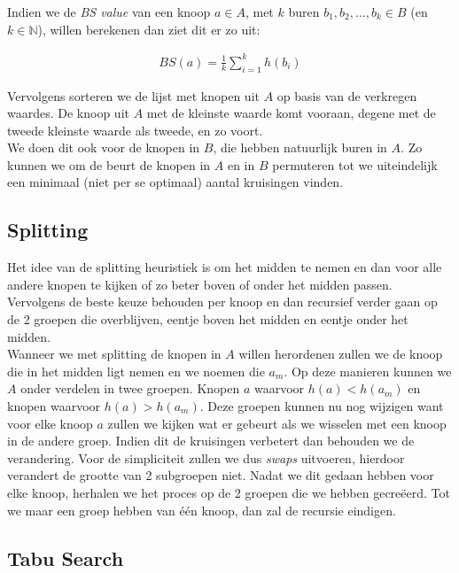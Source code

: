 \documentclass[kulak]{kulakarticle} %
\begin{document}
\noindent Indien we de \textit{BS value} van een knoop $a \in A$, met $k$ buren $b_1, b_2, ..., b_k \in B$ (en $k \in \mathbb{N}$), willen berekenen dan ziet dit er zo uit:

\begin{align*}
    \textit{BS}(a) = \frac{1}{k} \sum_{i=1}^{k} h(b_i) 
\end{align*}

\noindent Vervolgens sorteren we de lijst met knopen uit $A$ op basis van de verkregen waardes. De knoop uit $A$ met de kleinste waarde komt vooraan, degene met de tweede kleinste waarde als tweede, en zo voort. \\

\noindent We doen dit ook voor de knopen in $B$, die hebben natuurlijk buren in $A$. Zo kunnen we om de beurt de knopen in $A$ en in $B$ permuteren tot we uiteindelijk een minimaal (niet per se optimaal) aantal kruisingen vinden. 

\subsection{Splitting}

Het idee van de splitting heuristiek is om het midden te nemen en dan voor alle andere knopen te kijken of zo beter boven of onder het midden passen. Vervolgens de beste keuze behouden per knoop en dan recursief verder gaan op de 2 groepen die overblijven, eentje boven het midden en eentje onder het midden. \\

\noindent Wanneer we met splitting de knopen in $A$ willen herordenen zullen we de knoop die in het midden ligt nemen en we noemen die $a_m$. Op deze manieren kunnen we $A$ onder verdelen in twee groepen. Knopen $a$ waarvoor $h(a) < h(a_m)$ en knopen waarvoor $h(a) > h(a_m)$. Deze groepen kunnen nu nog wijzigen want voor elke knoop $a$ zullen we kijken wat er gebeurt als we wisselen met een knoop in de andere groep. Indien dit de kruisingen verbetert dan behouden we de verandering. Voor de simpliciteit zullen we dus \textit{swaps} uitvoeren, hierdoor verandert de grootte van 2 subgroepen niet. Nadat we dit gedaan hebben voor elke knoop, herhalen we het proces op de 2 groepen die we hebben gecreëerd. Tot we maar een groep hebben van één knoop, dan zal de recursie eindigen. 


\subsection{Tabu Search}
\end{document}
